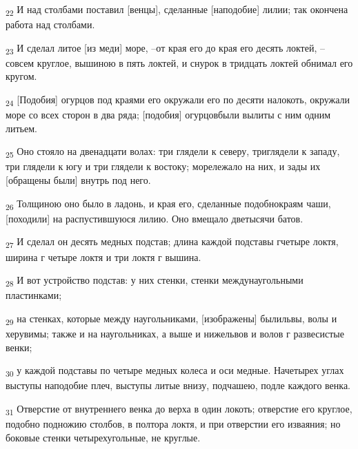 \begin{tcolorbox}
\textsubscript{22} И над столбами поставил [венцы], сделанные [наподобие] лилии; так окончена работа над столбами.
\end{tcolorbox}
\begin{tcolorbox}
\textsubscript{23} И сделал литое [из меди] море, --от края его до края его десять локтей, --совсем круглое, вышиною в пять локтей, и снурок в тридцать локтей обнимал его кругом.
\end{tcolorbox}
\begin{tcolorbox}
\textsubscript{24} [Подобия] огурцов под краями его окружали его по десяти налокоть, окружали море со всех сторон в два ряда; [подобия] огурцовбыли вылиты с ним одним литьем.
\end{tcolorbox}
\begin{tcolorbox}
\textsubscript{25} Оно стояло на двенадцати волах: три глядели к северу, триглядели к западу, три глядели к югу и три глядели к востоку; морележало на них, и зады их [обращены были] внутрь под него.
\end{tcolorbox}
\begin{tcolorbox}
\textsubscript{26} Толщиною оно было в ладонь, и края его, сделанные подобнокраям чаши, [походили] на распустившуюся лилию. Оно вмещало дветысячи батов.
\end{tcolorbox}
\begin{tcolorbox}
\textsubscript{27} И сделал он десять медных подстав; длина каждой подставы гчетыре локтя, ширина г четыре локтя и три локтя г вышина.
\end{tcolorbox}
\begin{tcolorbox}
\textsubscript{28} И вот устройство подстав: у них стенки, стенки междунаугольными пластинками;
\end{tcolorbox}
\begin{tcolorbox}
\textsubscript{29} на стенках, которые между наугольниками, [изображены] былильвы, волы и херувимы; также и на наугольниках, а выше и нижельвов и волов г развесистые венки;
\end{tcolorbox}
\begin{tcolorbox}
\textsubscript{30} у каждой подставы по четыре медных колеса и оси медные. Начетырех углах выступы наподобие плеч, выступы литые внизу, подчашею, подле каждого венка.
\end{tcolorbox}
\begin{tcolorbox}
\textsubscript{31} Отверстие от внутреннего венка до верха в один локоть; отверстие его круглое, подобно подножию столбов, в полтора локтя, и при отверстии его изваяния; но боковые стенки четырехугольные, не круглые.
\end{tcolorbox}
